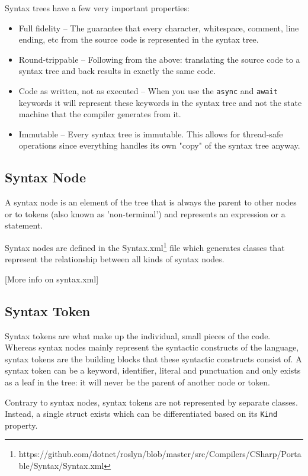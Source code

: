 Syntax trees have a few very important properties:

\begin{itemize}
	\item Full fidelity -- The guarantee that every character, whitespace, comment, line ending, etc from the source code is represented in the syntax tree.
	\item Round-trippable -- Following from the above: translating the source code to a syntax tree and back results in exactly the same code.
	\item Code as written, not as executed -- When you use the \texttt{async} and \texttt{await} keywords it will represent these keywords in the syntax tree and not the state machine that the compiler generates from it.
	\item Immutable -- Every syntax tree is immutable. This allows for thread-safe operations since everything handles its own "copy" of the syntax tree anyway.
\end{itemize}

\subsection{Syntax Node}
\label{sec:syntax-node}

A syntax node is an element of the tree that is always the parent to other nodes or to tokens (also known as 'non-terminal') and represents an expression or a statement. 

Syntax nodes are defined in the Syntax.xml\footnote{https://github.com/dotnet/roslyn/blob/master/src/Compilers/CSharp/Portable/Syntax/Syntax.xml} file which generates classes that represent the relationship between all kinds of syntax nodes. 

[More info on syntax.xml]

\subsection{Syntax Token}
\label{sec:syntax-token}

Syntax tokens are what make up the individual, small pieces of the code. Whereas syntax nodes mainly represent the syntactic constructs of the language, syntax tokens are the building blocks that these syntactic constructs consist of.
A syntax token can be a keyword, identifier, literal and punctuation and only exists as a leaf in the tree: it will never be the parent of another node or token.

Contrary to syntax nodes, syntax tokens are not represented by separate classes. Instead, a single struct exists which can be differentiated based on its \texttt{Kind} property. 

